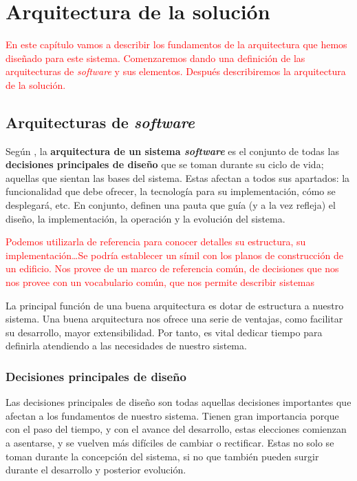 \chapter{Arquitectura de la solución}

\textcolor{red}{En este capítulo vamos a describir los fundamentos de la arquitectura que hemos diseñado para este sistema. Comenzaremos dando una definición de las arquitecturas de \textit{software} y sus elementos. Después describiremos la arquitectura de la solución.}

\section{Arquitecturas de \textit{software}}

Según \cite{taylorSoftwareArchitectureFoundations2009}, la {\bf arquitectura de un sistema \textit{software}} es el conjunto de todas las \textbf{decisiones principales de diseño} que se toman durante su ciclo de vida; aquellas que sientan las bases del sistema. Estas afectan a todos sus apartados: la funcionalidad que debe ofrecer, la tecnología para su implementación, cómo se desplegará, etc. En conjunto, definen una pauta que guía (y a la vez refleja) el diseño, la implementación, la operación y la evolución del sistema.

\textcolor{red}{Podemos utilizarla de referencia para conocer detalles su estructura, su implementación\dots Se podría establecer un símil con los planos de construcción de un edificio. Nos provee de un marco de referencia común, de decisiones que nos nos provee con un vocabulario común, que nos permite describir sistemas}

La principal función de una buena arquitectura es dotar de estructura a nuestro sistema. \cite{martinCleanArchitectureCraftsman2018} Una buena arquitectura nos ofrece una serie de ventajas, como facilitar su desarrollo, mayor extensibilidad. Por tanto, es vital dedicar tiempo para definirla atendiendo a las necesidades de nuestro sistema.

\subsection{Decisiones principales de diseño}

Las decisiones principales de diseño son todas aquellas decisiones importantes que afectan a los fundamentos de nuestro sistema. Tienen gran importancia porque con el paso del tiempo, y con el avance del desarrollo, estas elecciones comienzan a asentarse, y se vuelven más difíciles de cambiar o rectificar. \cite{taylorSoftwareArchitectureFoundations2009} Estas no solo se toman durante la concepción del sistema, si no que también pueden surgir durante el desarrollo y posterior evolución.

